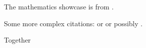 \documentclass{article}
\begin{document}
The mathematics showcase is from \autocite{Graham1995}.

Some more complex citations: \parencite{Graham1995} or
\textcite{Thomas2008} or possibly .

\autocite[56]{Thomas2008}

\autocite[See][45-48]{Graham1995}

Together \autocite{Thomas2008,Graham1995}

\printbibliography
\end{document}
